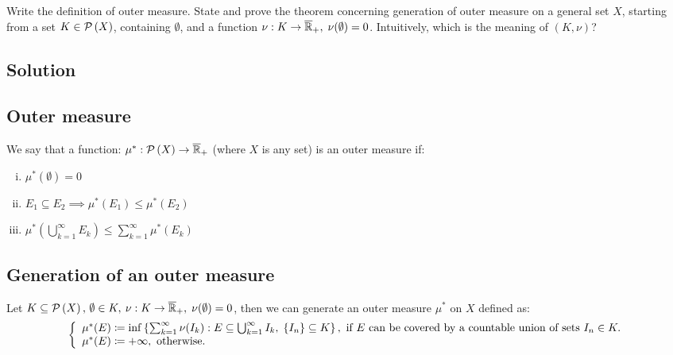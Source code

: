 

\question
Write the definition of outer measure. State and prove the theorem concerning generation of
outer measure on a general set $X$, starting from a set $K \in\mathcal{P}\left(X\right)$, containing $\emptyset$, and a function
$\nu : K \to \overline{\mathbb{R}}_{+}, \; \nu(\emptyset) = 0$. Intuitively, which is the meaning of $(K, \nu)$?

\subsection*{Solution}

\subsection{Outer measure}\label{outer:def}
We say that a function: $\mu^*:\mathcal{P}\left(X\right)\to\overline{\mathbb{R}}_{+}$ (where $X$ is any set) is an outer measure if:
\begin{enumerate}[i)]
    \item $\mu^*(\emptyset)=0$
    \item \label{outer:mono}$E_1\subseteq E_2 \implies \mu^*(E_1) \leq \mu^*(E_2)$
    \item \label{outer:sub}$\mu^*\left( \bigcup_{k=1}^{\infty} E_k \right) \leq \sum_{k=1}^{\infty} \mu^*(E_k)$
\end{enumerate}

\subsection{Generation of an outer measure} \label{outer:gen}
Let $K\subseteq\mathcal{P}\left(X\right), \, \emptyset\in K, \: \nu:K\to\overline{\mathbb{R}}_{+}, \; \nu(\emptyset)=0$, then we can generate an outer measure $\mu^*$ on $X$ defined as:
\[
    \left\{ \begin{array}{l}
        \mu^*(E) \coloneqq \inf \left\{ \sum_{k=1}^{\infty} \nu(I_k) : E\subseteq \bigcup_{k=1}^{\infty} I_k,\; \{ I_n \}\subseteq K \right\} , \text{ if } E \text{ can be covered by a countable union of sets } I_n\in K. \\
        \mu^*(E) \coloneqq +\infty, \text{ otherwise.}
    \end{array} \right.
\]

